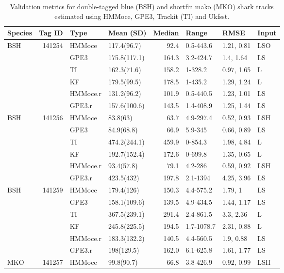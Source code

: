 \begin{table}[h!] %
\caption[Validation metrics for geolocation methods]{Validation metrics for double-tagged
blue (BSH) and shortfin mako (MKO) shark tracks estimated using HMMoce,
GPE3, Trackit (TI) and Ukfsst.}
\label{tab:c2t2}
\centering
\begin{tabular}[t]{lrllrlll}
\toprule
\textbf{Species} & \textbf{Tag ID} & \textbf{Type} & \textbf{Mean (SD)} & \textbf{Median} & \textbf{Range} & \textbf{RMSE} & \textbf{Input}\\
\midrule
BSH & 141254 & HMMoce & 117.4(96.7) & 92.4 & 0.5-443.6 & 1.21, 0.81 & LSO\\
 &  & GPE3 & 175.8(117.1) & 164.3 & 3.2-424.7 & 1.4, 1.64 & LS\\
 &  & TI & 162.3(71.6) & 158.2 & 1-328.2 & 0.97, 1.65 & L\\
 &  & KF & 179.5(99.5) & 178.5 & 1-435.2 & 1.29, 1.24 & L\\
 &  & HMMoce.r & 131.2(96.2) & 101.9 & 0.5-440.5 & 1.23, 1.01 & LS\\
 &  & GPE3.r & 157.6(100.6) & 143.5 & 1.4-408.9 & 1.25, 1.44 & LS\\
\addlinespace
BSH & 141256 & HMMoce & 83.8(63) & 63.7 & 4.9-297.4 & 0.52, 0.93 & LSH\\
 &  & GPE3 & 84.9(68.8) & 66.9 & 5.9-345 & 0.66, 0.89 & LS\\
 &  & TI & 474.2(244.1) & 459.9 & 0-854.3 & 1.98, 4.84 & L\\
 &  & KF & 192.7(152.4) & 172.6 & 0-699.8 & 1.35, 0.65 & L\\
 &  & HMMoce.r & 93.4(57.8) & 79.1 & 4.2-286 & 0.59, 0.92 & LSH\\
 &  & GPE3.r & 423.5(432) & 197.8 & 2.1-1394 & 4.25, 3.96 & LS\\
\addlinespace
BSH & 141259 & HMMoce & 179.4(126) & 150.3 & 4.4-575.2 & 1.79, 1 & LS\\
 &  & GPE3 & 158.1(109.6) & 139.5 & 4.9-434.5 & 1.44, 1.17 & LS\\
 &  & TI & 367.5(239.1) & 291.4 & 2.4-861.5 & 3.3, 2.36 & L\\
 &  & KF & 245.8(225.5) & 194.5 & 1.7-1078.7 & 2.31, 0.88 & L\\
 &  & HMMoce.r & 183.3(132.2) & 140.5 & 4.4-560.5 & 1.9, 0.88 & LS\\
 &  & GPE3.r & 198(129.5) & 162.0 & 6.1-625.8 & 1.61, 1.77 & LS\\
\addlinespace
MKO & 141257 & HMMoce & 99.8(90.7) & 66.8 & 3.8-426.9 & 0.92, 0.99 & LSH\\

\end{tabular}
\end{table}
